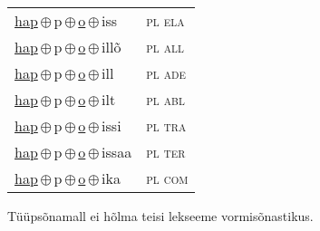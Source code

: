 \begin{minipage}{\textwidth}
\begin{sideways}
\begin{tabular}{l l}
\underline{hap}\,$\oplus$\,p\,$\oplus$\,\underline{o}\,$\oplus$\,iss & \textsc{ pl ela } \\
\underline{hap}\,$\oplus$\,p\,$\oplus$\,\underline{o}\,$\oplus$\,illõ & \textsc{ pl all } \\
\underline{hap}\,$\oplus$\,p\,$\oplus$\,\underline{o}\,$\oplus$\,ill & \textsc{ pl ade } \\
\underline{hap}\,$\oplus$\,p\,$\oplus$\,\underline{o}\,$\oplus$\,ilt & \textsc{ pl abl } \\
\underline{hap}\,$\oplus$\,p\,$\oplus$\,\underline{o}\,$\oplus$\,issi & \textsc{ pl tra } \\
\underline{hap}\,$\oplus$\,p\,$\oplus$\,\underline{o}\,$\oplus$\,issaa & \textsc{ pl ter } \\
\underline{hap}\,$\oplus$\,p\,$\oplus$\,\underline{o}\,$\oplus$\,ika & \textsc{ pl com } \\
\end{tabular}
\end{sideways}
\label{tab:tüüpsõnamall-hapo}

\end{minipage}

 
\vspace{1em}
\noindent Tüüpsõnamall  ei hõlma teisi lekseeme vormi\-sõnastikus.
